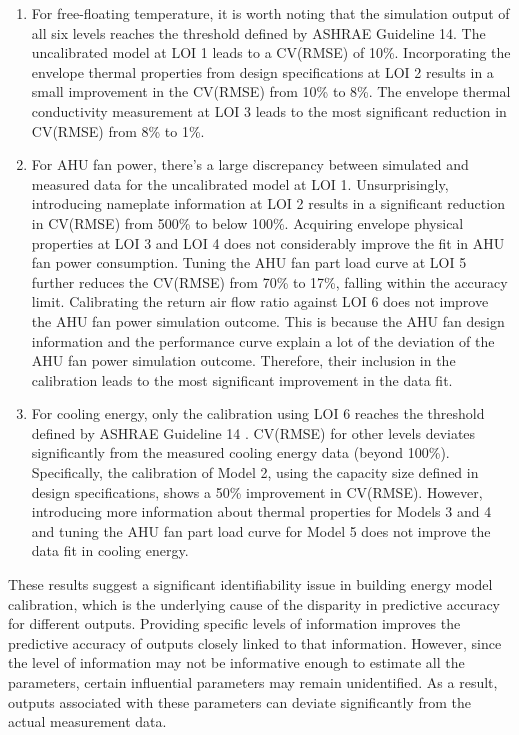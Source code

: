 \documentclass[3p,times,12pt]{elsarticle}
\begin{document}
\begin{sloppypar}
\begin{enumerate}
    \item For free-floating temperature, it is worth noting that the simulation output of all six levels reaches the threshold defined by ASHRAE Guideline 14. The uncalibrated model at LOI 1 leads to a CV(RMSE) of 10\%. Incorporating the envelope thermal properties from design specifications at LOI 2 results in a small improvement in the CV(RMSE) from 10\% to 8\%. The envelope thermal conductivity measurement at LOI 3 leads to the most significant reduction in CV(RMSE) from 8\% to 1\%. 
    \item For AHU fan power, there's a large discrepancy between simulated and measured data for the uncalibrated model at LOI 1. Unsurprisingly, introducing nameplate information at LOI 2 results in a significant reduction in CV(RMSE) from 500\% to below 100\%. Acquiring envelope physical properties at LOI 3 and LOI 4 does not considerably improve the fit in AHU fan power consumption. Tuning the AHU fan part load curve at LOI 5 further reduces the CV(RMSE) from 70\% to 17\%, falling within the accuracy limit. Calibrating the return air flow ratio against LOI 6 does not improve the AHU fan power simulation outcome. This is because the AHU fan design information and the performance curve explain a lot of the deviation of the AHU fan power simulation outcome. Therefore, their inclusion in the calibration leads to the most significant improvement in the data fit. 
    \item For cooling energy, only the calibration using LOI 6 reaches the threshold defined by ASHRAE Guideline 14 \cite{guideline200214}. CV(RMSE) for other levels deviates significantly from the measured cooling energy data (beyond 100\%). Specifically, the calibration of Model 2, using the capacity size defined in design specifications, shows a 50\% improvement in CV(RMSE). However, introducing more information about thermal properties for Models 3 and 4 and tuning the AHU fan part load curve for Model 5 does not improve the data fit in cooling energy.
\end{enumerate}

These results suggest a significant identifiability issue in building energy model calibration, which is the underlying cause of the disparity in predictive accuracy for different outputs. Providing specific levels of information improves the predictive accuracy of outputs closely linked to that information. However, since the level of information may not be informative enough to estimate all the parameters, certain influential parameters may remain unidentified. As a result, outputs associated with these parameters can deviate significantly from the actual measurement data.


\end{sloppypar}
\end{document}
